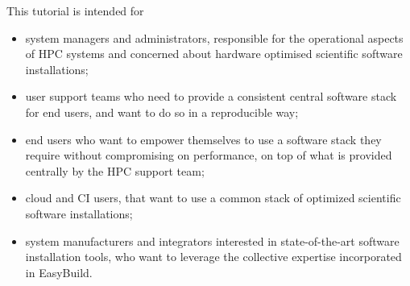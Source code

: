 This tutorial is intended for
\begin{itemize}
    \item system managers and administrators, responsible for the operational aspects of HPC systems and concerned about hardware optimised scientific software installations;
    \item user support teams who need to provide a consistent central software stack for end users, and want to do so in a reproducible way;
    \item end users who want to empower themselves to use a software stack they require without compromising on performance, on top of what is provided centrally by the HPC support team;
    \item cloud and CI users, that want to use a common stack of optimized scientific software installations;
    \item system manufacturers and integrators interested in state-of-the-art software installation tools, who want to leverage the collective expertise incorporated in EasyBuild.
\end{itemize}

